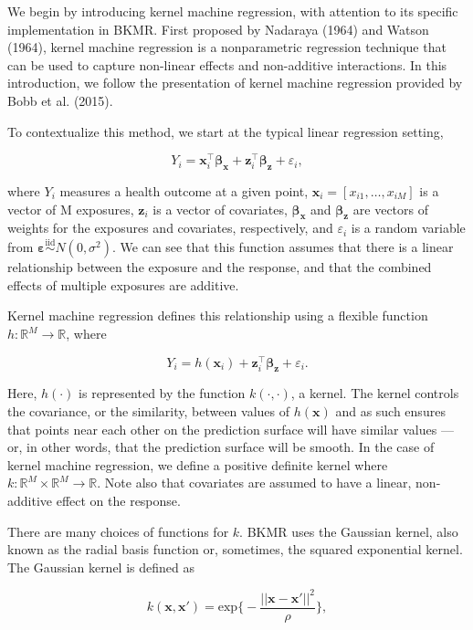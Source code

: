 \documentclass[12pt, twoside]{amherstthesis}
\begin{document}
We begin by introducing kernel machine regression, with attention to its specific implementation in BKMR. First proposed by Nadaraya (1964) and Watson (1964), kernel machine regression is a nonparametric regression technique that can be used to capture non-linear effects and non-additive interactions. In this introduction, we follow the presentation of kernel machine regression provided by Bobb et al. (2015).

To contextualize this method, we start at the typical linear regression setting,

\[
Y_i = \textbf{x}_i^\top \boldsymbol{\beta}_{\textbf{x}} + \textbf{z}_i^\top \boldsymbol{\beta}_{\textbf{z}} + \varepsilon_i,
\]

\noindent where \(Y_i\) measures a health outcome at a given point, \(\textbf{x}_i = [x_{i1},\dots,x_{iM}]\) is a vector of M exposures, \(\textbf{z}_i\) is a vector of covariates, \(\boldsymbol{\beta}_{\textbf{x}}\) and \(\boldsymbol{\beta}_{\textbf{z}}\) are vectors of weights for the exposures and covariates, respectively, and \(\varepsilon_i\) is a random variable from \(\boldsymbol\varepsilon \overset{\mathrm{iid}}{\sim} N(0, \sigma^2)\). We can see that this function assumes that there is a linear relationship between the exposure and the response, and that the combined effects of multiple exposures are additive.

Kernel machine regression defines this relationship using a flexible function \(h: \mathbb{R}^M \rightarrow \mathbb{R}\), where

\[
Y_i = h(\textbf{x}_i) + \textbf{z}_i^\top \boldsymbol{\beta}_{\textbf{z}} + \varepsilon_i.
\]

\noindent Here, \(h(\cdot)\) is represented by the function \(k(\cdot, \cdot)\), a kernel. The kernel controls the covariance, or the similarity, between values of \(h(\textbf{x})\) and as such ensures that points near each other on the prediction surface will have similar values --- or, in other words, that the prediction surface will be smooth. In the case of kernel machine regression, we define a positive definite kernel where \(k: \mathbb{R}^M\times \mathbb{R}^M \rightarrow \mathbb{R}\). Note also that covariates are assumed to have a linear, non-additive effect on the response.

There are many choices of functions for \(k\). BKMR uses the Gaussian kernel, also known as the radial basis function or, sometimes, the squared exponential kernel. The Gaussian kernel is defined as

\[
k(\textbf{x}, \textbf{x}') = \textrm{exp}\bigg\{
-\frac{||\textbf{x}-\textbf{x}'||^2}{\rho} \bigg\},
\]
\end{document}
